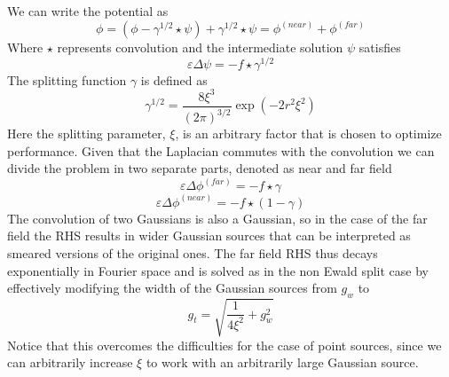 \documentclass[ twoside,openright,titlepage,numbers=noenddot,%
headinclude,footinclude,cleardoublepage=empty,abstract=on,
BCOR=5mm,paper=a4,fontsize=11pt, dvipsnames
]{scrreprt}
\begin{document}
We can write the potential as
\begin{equation}
 \phi=(\phi - \gamma^{1/2}\star\psi) + \gamma^{1/2}\star\psi = \phi^{(near)} + \phi^{(far)}
\end{equation}
Where $\star$ represents convolution and the intermediate solution $\psi$ satisfies
 \begin{equation}
 \varepsilon\Delta\psi=-f\star\gamma^{1/2}
\end{equation}   
The splitting function $\gamma$ is defined as
 \begin{equation}
 \gamma^{1/2} = \frac{8\xi^3}{(2\pi)^{3/2}}\exp\left(-2r^2\xi^2\right)
\end{equation}
Here the splitting parameter, $\xi$, is an arbitrary factor that is chosen to optimize performance. 
Given that the Laplacian commutes with the convolution we can divide the problem in two separate parts, denoted as near and far field  
 \begin{equation}
 \varepsilon\Delta\phi^{(far)}=-f\star\gamma
\end{equation}   
\begin{equation}
 \label{tppoisson_ewald_near}
 \varepsilon\Delta\phi^{(near)}=-f\star(1-\gamma)
\end{equation}   
The convolution of two Gaussians is also a Gaussian, so in the case of the far field the RHS results in wider Gaussian sources that can be interpreted as smeared versions of the original ones. The far field RHS thus decays exponentially in Fourier space and is solved as in the non Ewald split case by effectively modifying the width of the Gaussian sources from $g_w$ to
\begin{equation}
  g_t = \sqrt{\frac{1}{4\xi^2} + g_w^2}
\end{equation}
Notice that this overcomes the difficulties for the case of point sources, since we can arbitrarily increase $\xi$ to work with an arbitrarily large Gaussian source.
\end{document}

